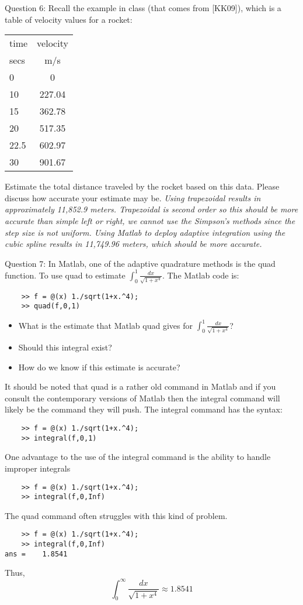 \documentclass{article}
\renewcommand{\cite}[1]{[#1]}
\def\ds{\displaystyle}
\begin{document}
Question 6:  Recall the example in class (that comes from \cite{KK09}), which is a table of velocity values for a rocket:
\begin{tabular}{|l|c|}
\hline
time & velocity\\

secs & m/s\\
\hline
0 & 0 \\
\hline
10 & 227.04 \\
\hline
15 & 362.78 \\
\hline
20 & 517.35 \\
\hline
22.5 & 602.97 \\
\hline
30 & 901.67\\
\hline
\end{tabular}

Estimate the total distance traveled by the rocket based on this data. Please discuss how accurate your estimate may be. 
{\it \color{teal} Using trapezoidal results in approximately 11,852.9 meters. Trapezoidal is second order so this should be more accurate than simple left or right, we cannot use the Simpson's methods since the step size is not uniform. Using Matlab to deploy adaptive integration using the cubic spline results in 11,749.96 meters, which should be more accurate. }
\medskip \par \noindent
Question 7: In Matlab, one of the adaptive quadrature methods is the quad function. To use quad to estimate $\ds \int_0^1 \frac {dx}{\sqrt{1+x^4}}$. The Matlab code is:
\begin{verbatim}
    >> f = @(x) 1./sqrt(1+x.^4);
    >> quad(f,0,1)
\end{verbatim}
\begin{itemize}
    \item What is the estimate that Matlab quad gives for $\ds \int_0^1 \frac {dx}{\sqrt{1+x^4}}$?
    \item Should this integral exist?
    \item How do we know if this estimate is accurate? 
\end{itemize}
It should be noted that quad is a rather old command in Matlab and if you consult the contemporary versions of Matlab then the integral command will likely be the command they will push. The integral command has the syntax:
\begin{verbatim}
    >> f = @(x) 1./sqrt(1+x.^4);
    >> integral(f,0,1)
\end{verbatim}
One advantage to the use of the integral command is the ability to handle improper integrals
\begin{verbatim}
    >> f = @(x) 1./sqrt(1+x.^4);
    >> integral(f,0,Inf)
\end{verbatim}
The quad command often struggles with this kind of problem.
{\color{teal}
\begin{verbatim}
    >> f = @(x) 1./sqrt(1+x.^4);
    >> integral(f,0,Inf)
ans =    1.8541    
\end{verbatim}
Thus,
$$\int_0^{\infty} \frac {dx}{\sqrt{1+x^4}} \approx 1.8541$$}
\end{document}
